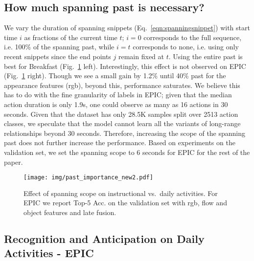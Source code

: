 \documentclass[runningheads]{llncs}
\makeatletter
\newcommand*{\ie}{i.e.\@\xspace}
\makeatother
\begin{document}
\subsection{How much spanning past is necessary?}\label{sec:spanning_past_inf}
We vary the duration of spanning snippets (Eq.~\ref{eqn:spanningsnippet}) with start time $i$ as fractions of the current time $t$; $i\!=\!0$ corresponds to the full sequence, \ie 100\% of the spanning past, while $i\!=\!t$ corresponds to none, \ie using only recent snippets since the end points $j$ remain fixed at $t$. Using the entire past is best for Breakfast (Fig.~\ref{fig:pastImportance} left). Interestingly, this effect is not observed on EPIC (Fig.~\ref{fig:pastImportance} right). Though we see a small gain by 1.2\% until 40\% past for the appearance features (rgb), beyond this, performance saturates. We believe this has to do with the fine granularity of labels in EPIC; given that the median action duration is only 1.9s, one could observe as many as 16 actions in 30 seconds. Given that the dataset has only 28.5K samples split over 2513 action classes, we speculate that the model cannot learn all the variants of long-range relationships beyond 30 seconds. Therefore, increasing the scope of the spanning past does not further increase the performance. Based on experiments on the validation set, we set the spanning scope to 6 seconds for EPIC for the rest of the paper.   

\begin{figure}[t]
\centering 
\texttt{[image: img/past\_importance\_new2.pdf]}
\caption{Effect of spanning scope on instructional vs.\ daily activities. For EPIC  we report Top-5 Acc. on the validation set with rgb, flow and object features and late fusion.}
\label{fig:pastImportance}
\end{figure}


\subsection{Recognition and Anticipation on Daily Activities - EPIC}\label{sec:daily_act}
\end{document}
